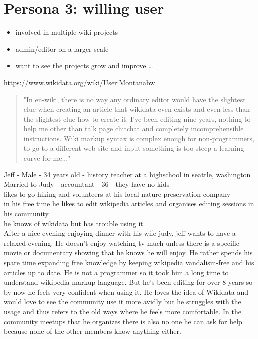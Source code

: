 \documentclass{article}
\begin{document}
\newpage

\section{Persona 3: willing user}

\begin{itemize}
\item involved in multiple wiki projects
\item admin/editor on a larger scale
\item want to see the projects grow and improve \ldots
\end{itemize}

https://www.wikidata.org/wiki/User:Montanabw
\begin{quote}
"In en-wiki, there is no way any ordinary editor would have the slightest clue when creating an article that wikidata even exists and even less than the slightest clue how to create it. I've been editing nine years, nothing to help me other than talk page chitchat and completely incomprehensible instructions. Wiki markup syntax is complex enough for non-programmers, to go to a different web site and input something is too steep a learning curve for me..."
\end{quote}

\noindent
Jeff - Male - 34 years old - history teacher at a highschool in seattle, washington \\
Married to Judy - accountant - 36 - they have no kids \\
likes to go hiking and volunteers at his local nature preservation company \\
in his free time he likes to edit wikipedia articles and organises editing sessions in his community \\
he knows of wikidata but has trouble using it \\

After a nice evening enjoying dinner with his wife judy, jeff wants to have a relaxed evening. He doesn't enjoy watching tv much unless there is a specific movie or documentary showing that he knows he will enjoy. He rather spends his spare time expanding free knowledge by keeping wikipedia vandalism-free and his articles up to date. He is not a programmer so it took him a long time to understand wikipedia markup language. But he's been editing for over 8 years so by now he feels very confident when using it. He loves the idea of Wikidata and would love to see the community use it more avidly but he struggles with the usage and thus refers to the old ways where he feels more comfortable. In the community meetups that he organizes there is also no one he can ask for help because  none of the other members know anything either. 
\end{document}
